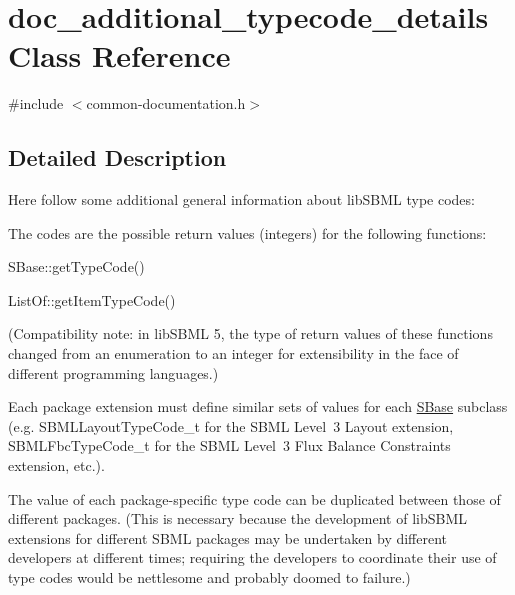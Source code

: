 \hypertarget{classdoc__additional__typecode__details}{}\section{doc\+\_\+additional\+\_\+typecode\+\_\+details Class Reference}
\label{classdoc__additional__typecode__details}


{\ttfamily \#include $<$common-\/documentation.\+h$>$}



\subsection{Detailed Description}
\begin{DoxyParagraph}{}
Here follow some additional general information about lib\+S\+B\+ML type codes\+:
\end{DoxyParagraph}
\begin{DoxyItemize}
\item The codes are the possible return values (integers) for the following functions\+: 
\begin{DoxyItemize}
\item S\+Base\+::get\+Type\+Code() 
\item List\+Of\+::get\+Item\+Type\+Code() 
\end{DoxyItemize}(Compatibility note\+: in lib\+S\+B\+ML 5, the type of return values of these functions changed from an enumeration to an integer for extensibility in the face of different programming languages.)\end{DoxyItemize}
\begin{DoxyItemize}
\item Each package extension must define similar sets of values for each \hyperlink{class_s_base}{S\+Base} subclass (e.\+g. {\ttfamily S\+B\+M\+L\+Layout\+Type\+Code\+\_\+t} for the S\+B\+ML Level~3 Layout extension, {\ttfamily S\+B\+M\+L\+Fbc\+Type\+Code\+\_\+t} for the S\+B\+ML Level~3 Flux Balance Constraints extension, etc.).\end{DoxyItemize}
\begin{DoxyItemize}
\item The value of each package-\/specific type code can be duplicated between those of different packages. (This is necessary because the development of lib\+S\+B\+ML extensions for different S\+B\+ML packages may be undertaken by different developers at different times; requiring the developers to coordinate their use of type codes would be nettlesome and probably doomed to failure.)\end{DoxyItemize}
